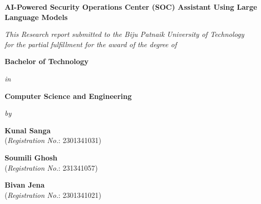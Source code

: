 \documentclass[12pt,a4paper,oneside]{report}
\begin{document}

\setcounter{page}{1}


\begin{titlepage}
\thispagestyle{empty}

\begin{center}

\vspace*{0.2cm}

{\huge \textbf{AI-Powered Security Operations Center (SOC) Assistant Using Large Language Models}}

\vspace{0.5cm}


\textit{
This Research report submitted to the Biju Patnaik University of Technology\\
for the partial fulfillment for the award of the degree of
}

\textbf{Bachelor of Technology}

\textit{in}

\textbf{Computer Science and Engineering}

\vspace{0.5cm}

\textit{by}

\begin{center}
\begin{minipage}{0.30\textwidth}
    \centering
    \textbf{Kunal Sanga}\\
    {\small (\textit{Registration No.}: 2301341031)}
\end{minipage}
\hspace{0.2cm}
\begin{minipage}{0.30\textwidth}
    \centering
    \textbf{Soumili Ghosh}\\
    {\small (\textit{Registration No.}: 231341057)}
\end{minipage}
\hspace{0.2cm}
\begin{minipage}{0.30\textwidth}
    \centering
    \textbf{Bivan Jena}\\
    {\small (\textit{Registration No.}: 2301341021)}
\end{minipage}


\end{center}
\end{center}
\end{titlepage}
\end{document}
